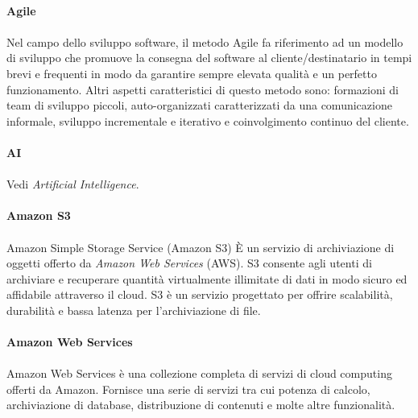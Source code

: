 \documentclass[10pt, a4paper]{article}
\begin{document}
\vspace{2em}
\paragraph{Agile}\noindent\hrulefill
\paragraph{}Nel campo dello sviluppo software, il metodo Agile fa riferimento ad un modello di sviluppo che promuove la consegna del software al cliente/destinatario in tempi brevi e frequenti in modo da garantire sempre elevata qualità e un perfetto funzionamento.
Altri aspetti caratteristici di questo metodo sono: formazioni di team di sviluppo piccoli, auto-organizzati caratterizzati da una comunicazione informale, sviluppo incrementale e iterativo e coinvolgimento continuo del cliente.


\vspace{2em}
\paragraph{AI}\noindent\hrulefill 
\paragraph{}Vedi \textit{Artificial Intelligence\pg}.


\vspace{2em}
\paragraph{Amazon S3}\noindent\hrulefill
\paragraph{}Amazon Simple Storage Service (Amazon S3) È un servizio di archiviazione di oggetti offerto da \textit{Amazon Web Services\pg} (AWS). S3 consente agli utenti di archiviare e recuperare quantità virtualmente illimitate di dati in modo sicuro ed affidabile attraverso il cloud. S3 è un servizio progettato per offrire scalabilità, durabilità e bassa latenza per l'archiviazione di file.

\vspace{2em}
\paragraph{Amazon Web Services}\noindent\hrulefill
\paragraph{}Amazon Web Services è una collezione completa di servizi di cloud computing offerti da Amazon. Fornisce una serie di servizi tra cui potenza di calcolo, archiviazione di database, distribuzione di contenuti e molte altre funzionalità.
\end{document}
